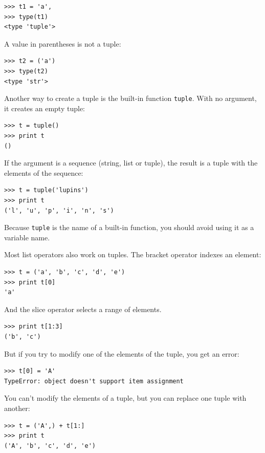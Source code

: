 \documentclass[10pt]{book}
\begin{document}
\begin{CJK}{UTF8}{gbsn}
\begin{verbatim}
>>> t1 = 'a',
>>> type(t1)
<type 'tuple'>
\end{verbatim}
%
A value in parentheses is not a tuple:

\begin{verbatim}
>>> t2 = ('a')
>>> type(t2)
<type 'str'>
\end{verbatim}
%
Another way to create a tuple is the built-in function {\tt tuple}.
With no argument, it creates an empty tuple:

\begin{verbatim}
>>> t = tuple()
>>> print t
()
\end{verbatim}
%
If the argument is a sequence (string, list or tuple), the result
is a tuple with the elements of the sequence:

\begin{verbatim}
>>> t = tuple('lupins')
>>> print t
('l', 'u', 'p', 'i', 'n', 's')
\end{verbatim}
%
Because {\tt tuple} is the name of a built-in function, you should
avoid using it as a variable name.

Most list operators also work on tuples.  The bracket operator
indexes an element:

\begin{verbatim}
>>> t = ('a', 'b', 'c', 'd', 'e')
>>> print t[0]
'a'
\end{verbatim}
%
And the slice operator selects a range of elements.

\begin{verbatim}
>>> print t[1:3]
('b', 'c')
\end{verbatim}
%
But if you try to modify one of the elements of the tuple, you get
an error:

\begin{verbatim}
>>> t[0] = 'A'
TypeError: object doesn't support item assignment
\end{verbatim}
%
You can't modify the elements of a tuple, but you can replace
one tuple with another:

\begin{verbatim}
>>> t = ('A',) + t[1:]
>>> print t
('A', 'b', 'c', 'd', 'e')
\end{verbatim}
%


\end{CJK}
\end{document}
